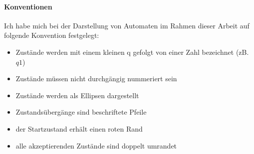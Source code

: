 \paragraph{Konventionen}
Ich habe mich bei der Darstellung von Automaten im Rahmen dieser Arbeit auf folgende Konvention festgelegt:
\begin{itemize}
	\item Zustände werden mit einem kleinen q gefolgt von einer Zahl bezeichnet (zB. $q1$)
	\item Zustände müssen nicht durchgängig nummeriert sein
	\item Zustände werden als Ellipsen dargestellt
	\item Zustandsübergänge sind beschriftete Pfeile
	\item der Startzustand erhält einen roten Rand
	\item alle akzeptierenden Zustände sind doppelt umrandet
\end{itemize}